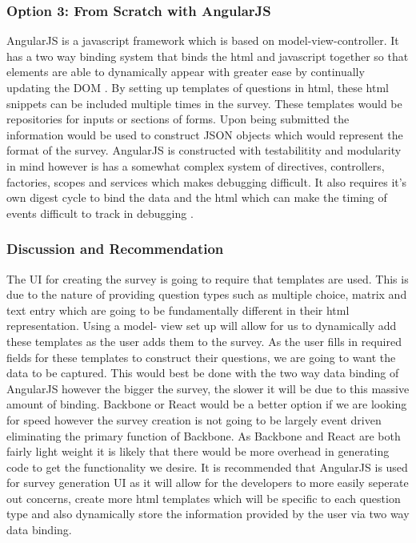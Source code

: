 \documentclass[letterpaper,10pt,serif, draftclsnofoot,onecolumn, compsoc, titlepage]{IEEEtran}
\begin{document}
\subsubsection{Option 3: From Scratch with AngularJS}
AngularJS is a javascript framework which is based on model-view-controller. It has a two way binding system that binds the html
 and javascript together so that  elements are able to dynamically appear with greater ease by continually updating the DOM \cite{angular}. By setting up templates of questions in html, these html snippets can be included multiple times in the survey. These templates would be repositories for inputs or sections of forms. Upon being submitted the information would be used to construct JSON objects which would represent the format of the survey. AngularJS is constructed with testabilitity and modularity in mind however is has a somewhat complex system of directives, controllers, factories, scopes and services which makes debugging difficult. It also requires it's own digest cycle to bind the data and the html which can make the timing of events difficult to track in debugging \cite{angVreact}. 
\subsubsection{Discussion and Recommendation}
The UI for creating the survey is going to require that templates are used. This is due to the nature of providing question types such
as multiple choice, matrix and text entry which are going to be fundamentally different in their html representation. Using a model-
view set up will allow for us to dynamically add these templates as the user adds them to the survey. As the user fills in required fields for these templates to construct their questions, we are going to want the data to be captured. This would best be done with 
the two way data binding of AngularJS however the bigger the survey, the slower it will be due to this massive amount of binding. 
Backbone or React would be a better option if we are looking for speed however the survey creation is not going to be largely 
event driven eliminating the primary function of Backbone. As Backbone and React are both fairly light weight it is likely that there
would be more overhead in generating code to get the functionality we desire. It is recommended that AngularJS is used for survey generation UI as it will allow for the developers to more easily seperate out concerns, create more html templates which will be
specific to each question type and also dynamically store the information provided by the user via two way data binding. 
\end{document}
